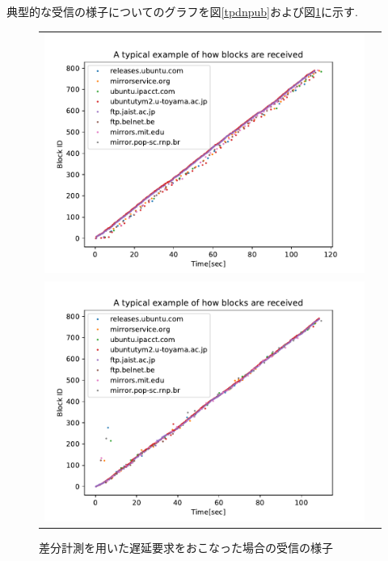 \documentclass[a4j,12pt]{gradthesis_utf8}
\begin{document}
\clearpage

典型的な受信の様子についてのグラフを図\ref{tpdnpub}および図\ref{tpddpub}に示す.
\begin{figure}[ht]
	\begin{center}
		\begin{tabular}{cc}
			\begin{minipage}[t]{0.8\hsize}
				\includegraphics[width=12.5cm]{figure/TypicalPlotDelay=NORMALInit=FalseDup=IBRC.pdf}
				\caption{遅延要求なしの場合の受信の様子}
				\label{tpdnpub}
			\end{minipage}\\
			\begin{minipage}[t]{0.8\hsize}
				\includegraphics[width=12.5cm]{figure/TypicalPlotDelay=DIFFInit=TrueDup=IBRC.pdf}
				\caption{差分計測を用いた遅延要求をおこなった場合の受信の様子}
				\label{tpddpub}
			\end{minipage}
		\end{tabular}
	\end{center}
\end{figure}
\end{document}
